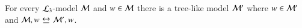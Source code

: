 
%

%



\begin{pro}\label{prop:tree-model-property} For every $\mathcal{L}_3$-model
$\mathcal{M}$ and $w\in\mathcal{M}$ there is a tree-like model $\mathcal{M}'$ where
$w\in\mathcal{M}'$ and $\model,w\bisim\model',w$.
\end{pro}

